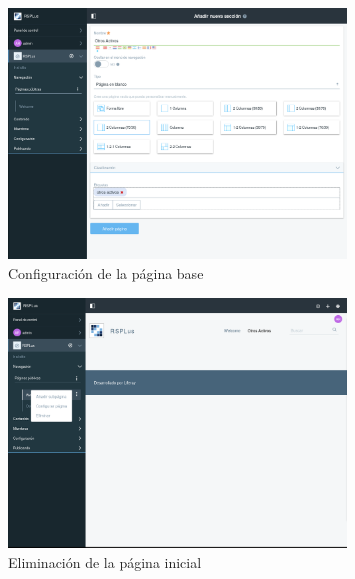\begin{figure}[H]
\begin{center}
\includegraphics[width=0.8\textwidth]{./img/liferay/3.png}
\end{center}
\caption{Configuración de la página base}
\label{img:lr3}
\end{figure}

\begin{figure}[H]
\begin{center}
\includegraphics[width=0.8\textwidth]{./img/liferay/4.png}
\end{center}
\caption{Eliminación de la página inicial}
\label{img:lr4}
\end{figure}

